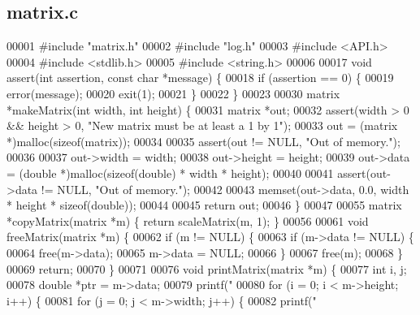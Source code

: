 \subsection{matrix.\+c}
\label{matrix_8c_source}

\begin{DoxyCode}
00001 \textcolor{preprocessor}{#include "matrix.h"}
00002 \textcolor{preprocessor}{#include "log.h"}
00003 \textcolor{preprocessor}{#include <API.h>}
00004 \textcolor{preprocessor}{#include <stdlib.h>}
00005 \textcolor{preprocessor}{#include <string.h>}
00006 
00017 \textcolor{keywordtype}{void} assert(\textcolor{keywordtype}{int} assertion, \textcolor{keyword}{const} \textcolor{keywordtype}{char} *message) \{
00018   \textcolor{keywordflow}{if} (assertion == 0) \{
00019     error(message);
00020     exit(1);
00021   \}
00022 \}
00023 
00030 matrix *makeMatrix(\textcolor{keywordtype}{int} width, \textcolor{keywordtype}{int} height) \{
00031   matrix *out;
00032   assert(width > 0 && height > 0, \textcolor{stringliteral}{"New matrix must be at least a 1 by 1"});
00033   out = (matrix *)malloc(\textcolor{keyword}{sizeof}(matrix));
00034 
00035   assert(out != NULL, \textcolor{stringliteral}{"Out of memory."});
00036 
00037   out->width = width;
00038   out->height = height;
00039   out->data = (\textcolor{keywordtype}{double} *)malloc(\textcolor{keyword}{sizeof}(\textcolor{keywordtype}{double}) * width * height);
00040 
00041   assert(out->data != NULL, \textcolor{stringliteral}{"Out of memory."});
00042 
00043   memset(out->data, 0.0, width * height * \textcolor{keyword}{sizeof}(\textcolor{keywordtype}{double}));
00044 
00045   \textcolor{keywordflow}{return} out;
00046 \}
00047 
00055 matrix *copyMatrix(matrix *m) \{ \textcolor{keywordflow}{return} scaleMatrix(m, 1); \}
00056 
00061 \textcolor{keywordtype}{void} freeMatrix(matrix *m) \{
00062   \textcolor{keywordflow}{if} (m != NULL) \{
00063     \textcolor{keywordflow}{if} (m->data != NULL) \{
00064       free(m->data);
00065       m->data = NULL;
00066     \}
00067     free(m);
00068   \}
00069   \textcolor{keywordflow}{return};
00070 \}
00071 
00076 \textcolor{keywordtype}{void} printMatrix(matrix *m) \{
00077   \textcolor{keywordtype}{int} i, j;
00078   \textcolor{keywordtype}{double} *ptr = m->data;
00079   printf(\textcolor{stringliteral}{"%
00080   \textcolor{keywordflow}{for} (i = 0; i < m->height; i++) \{
00081     \textcolor{keywordflow}{for} (j = 0; j < m->width; j++) \{
00082       printf(\textcolor{stringliteral}{" %
}}
\end{DoxyCode}
